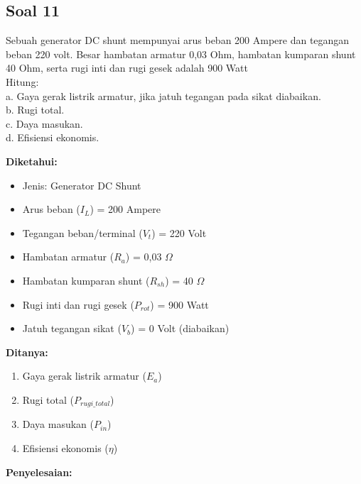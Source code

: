\documentclass[12pt, a4paper]{article}
\begin{document}
\subsection*{Soal 11}
Sebuah generator DC shunt mempunyai arus beban 200 Ampere dan tegangan beban 220 volt. Besar hambatan armatur 0,03 Ohm, hambatan kumparan shunt 40 Ohm, serta rugi inti dan rugi gesek adalah 900 Watt\\
Hitung:\\
a. Gaya gerak listrik armatur, jika jatuh tegangan pada sikat diabaikan.\\
b. Rugi total.\\
c. Daya masukan.\\
d. Efisiensi ekonomis.

\textbf{Diketahui:}
\begin{itemize}
    \item Jenis: Generator DC Shunt
    \item Arus beban ($I_L$) = 200 Ampere
    \item Tegangan beban/terminal ($V_t$) = 220 Volt
    \item Hambatan armatur ($R_a$) = 0,03 $\Omega$
    \item Hambatan kumparan shunt ($R_{sh}$) = 40 $\Omega$
    \item Rugi inti dan rugi gesek ($P_{rot}$) = 900 Watt
    \item Jatuh tegangan sikat ($V_b$) = 0 Volt (diabaikan)
\end{itemize}

\textbf{Ditanya:}
\begin{enumerate}[label=\alph*.]
    \item Gaya gerak listrik armatur ($E_a$)
    \item Rugi total ($P_{rugi\_total}$)
    \item Daya masukan ($P_{in}$)
    \item Efisiensi ekonomis ($\eta$)
\end{enumerate}

\textbf{Penyelesaian:}
\end{document}
